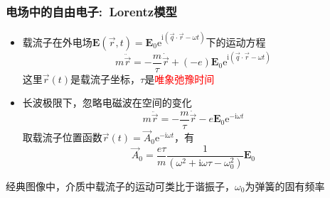 {\frame
{
	\frametitle{电场中的自由电子:~\textrm{Lorentz}模型}
	\begin{itemize}
		\item 载流子在外电场$\mathbf{E}(\vec r,t)=\mathbf{E}_0\mathrm{e}^{\mathrm{i}(\vec q\cdot\vec r-\omega t)}$下的运动方程
			\begin{displaymath}
				m\ddot{\vec r}=-\frac m{\tau}\dot{\vec r}+(-e)\mathbf{E}_0\mathrm{e}^{\mathrm{i}(\vec q\cdot\vec r-\omega t)}
			\end{displaymath}
			这里$\vec r(t)$是载流子坐标，$\tau$是\textcolor{red}{唯象弛豫时间}
		\item 长波极限下，忽略电磁波在空间的变化
			\begin{displaymath}
				m\ddot{\vec r}=-\frac m{\tau}\dot{\vec r}-e\mathbf{E}_0\mathrm{e}^{-\mathrm{i}\omega t}
			\end{displaymath}
			取载流子位置函数$\vec r(t)=\vec A_0\mathrm{e}^{-\mathrm{i}\omega t}$，有
			\begin{displaymath}
				\vec A_0=\frac{e\tau}m\frac1{(\omega^2+\mathrm{i}\omega\tau-\omega_0^2)}\mathbf{E}_0
			\end{displaymath}
	\end{itemize}
	经典图像中，介质中载流子的运动可类比于谐振子，$\omega_0$为弹簧的固有频率
}

}
